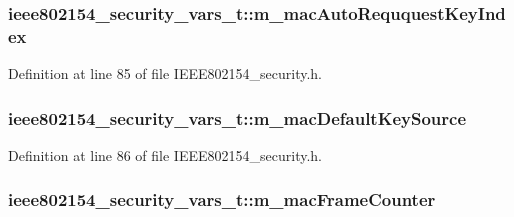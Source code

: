 \subsubsection[{\texorpdfstring{m\+\_\+mac\+Auto\+Reququest\+Key\+Index}{m_macAutoReququestKeyIndex}}]{ ieee802154\+\_\+security\+\_\+vars\+\_\+t\+::m\+\_\+mac\+Auto\+Reququest\+Key\+Index}\hypertarget{structieee802154__security__vars__t_a3d91f527a643e283d110850a1f0996ff}{}\label{structieee802154__security__vars__t_a3d91f527a643e283d110850a1f0996ff}


Definition at line 85 of file I\+E\+E\+E802154\+\_\+security.\+h.

\subsubsection[{\texorpdfstring{m\+\_\+mac\+Default\+Key\+Source}{m_macDefaultKeySource}}]{ ieee802154\+\_\+security\+\_\+vars\+\_\+t\+::m\+\_\+mac\+Default\+Key\+Source}\hypertarget{structieee802154__security__vars__t_a10216ed0aad7d9691d38957a5137d392}{}\label{structieee802154__security__vars__t_a10216ed0aad7d9691d38957a5137d392}


Definition at line 86 of file I\+E\+E\+E802154\+\_\+security.\+h.

\subsubsection[{\texorpdfstring{m\+\_\+mac\+Frame\+Counter}{m_macFrameCounter}}]{ ieee802154\+\_\+security\+\_\+vars\+\_\+t\+::m\+\_\+mac\+Frame\+Counter}\hypertarget{structieee802154__security__vars__t_af9d07f6dfaec2372e30f8632d5d78051}{}\label{structieee802154__security__vars__t_af9d07f6dfaec2372e30f8632d5d78051}



